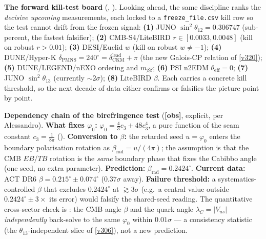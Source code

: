 \documentclass[11pt,a4paper]{article}
\newcommand{\fobs}{{\small\textcolor{tfblue!70!black}{\textbf{[obs]}}}}
\newcommand{\cthree}{c_3}
\newcommand{\phiz}{\varphi_0}
\begin{document}
\par\smallskip\noindent\textbf{The forward kill-test board} (\mE, ). Looking ahead,
the same discipline ranks the \emph{decisive upcoming} measurements, each locked to a \texttt{freeze\_file.csv} kill
row so the test cannot drift from the frozen signal: \textbf{(1)} JUNO $\sin^2\theta_{12}=0.306747$ (sub-percent, the
fastest falsifier); \textbf{(2)} CMB-S4/LiteBIRD $r\in[0.0033,0.0048]$ (kill on robust $r>0.01$); \textbf{(3)}
DESI/Euclid $w$ (kill on robust $w\ne-1$); \textbf{(4)} DUNE/Hyper-K $\delta_{\mathrm{PMNS}}=240^\circ=
\delta_{\mathrm{CKM}}^{\mathrm{lead}}+\pi$ (the new Galois-CP relation of \vref{v320}); \textbf{(5)} DUNE/LEGEND/nEXO
ordering and $m_{\beta\beta}$; \textbf{(6)} PSI n2EDM $\theta_{\mathrm{eff}}=0$; \textbf{(7)} JUNO $\sin^2\theta_{13}$
(currently $\sim2\sigma$); \textbf{(8)} LiteBIRD $\beta$. Each carries a concrete kill threshold, so the next decade
of data either confirms or falsifies the picture point by point.

\par\smallskip\noindent\textbf{Dependency chain of the birefringence test} (\fobs, explicit, per Alessandro).
\textbf{What fixes $\phiz$:} $\phiz=\tfrac43\cthree+48\cthree^4$, a pure function of the seam constant
$\cthree=\tfrac1{8\pi}$ (\mE). \textbf{Conversion to $\beta$:} the retarded seed $u=\phiz$ enters the
boundary polarisation rotation as $\beta_{\mathrm{rad}}=u/(4\pi)$; the assumption is that the CMB
$EB$/$TB$ rotation is the \emph{same} boundary phase that fixes the Cabibbo angle (one seed, no extra
parameter). \textbf{Prediction:} $\beta_{\mathrm{rad}}=0.2424^\circ$. \textbf{Current data:} ACT DR6
$\beta=0.215^\circ\pm0.074^\circ$ ($0.37\sigma$ away). \textbf{Failure threshold:} a systematics-controlled
$\beta$ that excludes $0.2424^\circ$ at $\gtrsim3\sigma$ (e.g.\ a central value outside
$0.2424^\circ\pm3\times$ its error) would falsify the shared-seed reading. 
The quantitative cross-sector check is : the CMB angle $\beta$ and the quark angle $\lambda_C{=}|V_{us}|$ \emph{independently} back-solve to the same $\phiz$ within $0.01\sigma$ --- a consistency statistic (the $\theta_{13}$-independent slice of \vref{v306}), not a new prediction.

\end{document}
